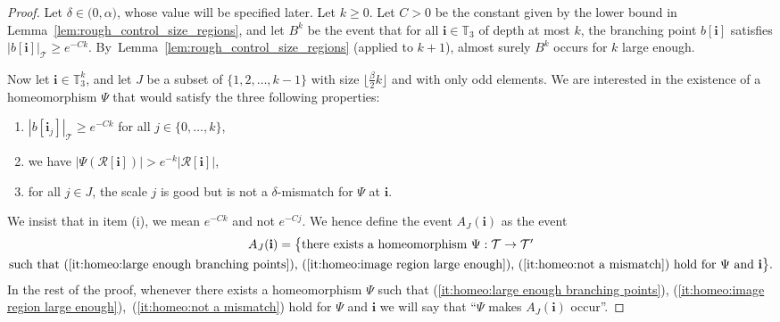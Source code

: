 \documentclass[11pt]{article}
\newenvironment{enumeratei}
{\bgroup\def\theenumi{\roman{enumi}}\def\theenumii{\arabic{enumii}}\begin{enumerate}}
{\end{enumerate}\egroup}
\newcommand{\intervalle}[4]{\mathopen{#1}#2\mathclose{}\mathpunct{},#3\mathclose{#4}}
\newcommand{\intervalleoo}[2]{\intervalle{(}{#1}{#2}{)}}
\newcommand{\Tt}{\mathcal{T}}
\newcommand{\Rr}{\mathcal{R}}
\newcommand{\ii}{\mathbf{i}}
\theoremstyle{plain}
\theoremstyle{definition}
\numberwithin{equation}{section}
\begin{document}
\begin{proof}
Let $\delta \in \intervalleoo{0}{\alpha}$, whose value will be specified later.
Let $k \geq 0$.
Let $C>0$ be the constant given by the lower bound in Lemma~\ref{lem:rough_control_size_regions}, and let $B^k$ be the event that for all $\ii \in \mathbb{T}_3$ of depth at most $k$, the branching point $b[\ii]$ satisfies $\left| b[\ii] \right|_{\Tt} \geq e^{-Ck}$.
By~Lemma~\ref{lem:rough_control_size_regions} (applied to $k+1$), almost surely $B^k$ occurs for $k$ large enough.

Now let $\ii \in \mathbb{T}_3^k$, and let $J$ be a subset of $\{ 1,2,\dots, k-1\}$ with size $\lfloor \frac{\beta}{2} k \rfloor$ and with only odd elements.
We are interested in the existence of a homeomorphism $\Psi$ that would satisfy the three following properties:
\begin{enumeratei}
\item\label{it:homeo:large enough branching points} $| b[\ii_j]|_{\Tt} \geq e^{-C k}$ for all $j\in\{0,\dots,k\}$,
\item\label{it:homeo:image region large enough} we have $\left| \Psi \left( \Rr[\ii] \right) \right| > e^{-k} \left| \Rr[\ii] \right|$,
\item\label{it:homeo:not a mismatch} for all $j \in J$, the scale $j$ is good but is not a $\delta$-mismatch for $\Psi$ at $\ii$.
\end{enumeratei}
We insist that in item (i), we mean $e^{-Ck}$ and not $e^{-Cj}$. We hence define the event $A_J(\ii)$ as the event
\begin{multline*}
A_J(\ii) = \big\{ \mbox{there exists a homeomorphism $\Psi:\mathcal{T} \to \mathcal{T}'$} \\ \mbox{such that (\ref{it:homeo:large enough branching points}), (\ref{it:homeo:image region large enough}), (\ref{it:homeo:not a mismatch}) hold for $\Psi$ and $\ii$}\big\}.
\end{multline*}
In the rest of the proof, whenever there exists a homeomorphism $\Psi$ such that (\ref{it:homeo:large enough branching points}), (\ref{it:homeo:image region large enough}),~(\ref{it:homeo:not a mismatch}) hold for $\Psi$ and $\ii$ we will say that ``$\Psi$ makes $A_J(\ii)$ occur''.


\end{proof}
\end{document}
